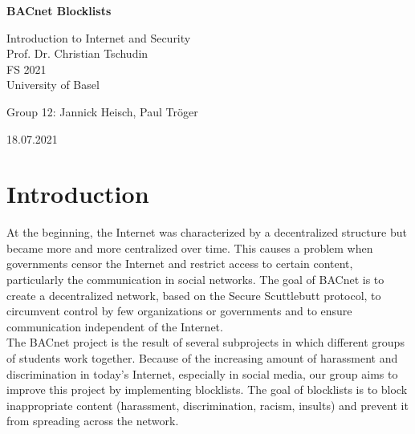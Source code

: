 \documentclass[12pt]{article}
\begin{document}
\begin{titlepage}
\centering
\vspace*{6cm}
{\huge\bfseries BACnet Blocklists\par}

\vspace{3cm}

{\Large Introduction to Internet and Security}\\
\vspace{0.1cm}
{\Large Prof. Dr. Christian Tschudin}\\
\vspace{0.1cm}
{\Large FS 2021}\\
\vspace{0.1cm}
{\Large University of Basel}

\vspace{1cm}

{\large Group 12: Jannick Heisch, Paul Tr\"oger}

\vspace{1cm}

{\large 18.07.2021}

\end{titlepage}


\section{Introduction}
At the beginning, the Internet was characterized by a decentralized structure but became more and more centralized over time.
This causes a problem when governments censor the Internet and restrict access to certain content, particularly the communication in social networks. 
The goal of BACnet is to create a decentralized network, based on the Secure Scuttlebutt protocol, to circumvent control by few organizations or governments and to ensure communication independent of the Internet. \\
The BACnet project is the result of several subprojects in which different groups of students work together. 
Because of the increasing amount of harassment and discrimination in today’s Internet, especially in social media, our group aims to improve this project by implementing blocklists. 
The goal of blocklists is to block inappropriate content (harassment, discrimination, racism, insults) and prevent it from spreading across the network.
\end{document}
